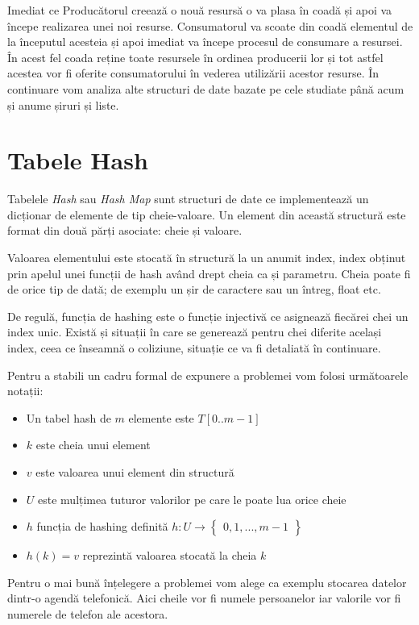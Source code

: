 Imediat ce Producătorul creează o nouă resursă o va plasa în coadă și apoi va începe realizarea unei noi resurse. Consumatorul va scoate din coadă elementul de la începutul acesteia și apoi imediat va începe procesul de consumare a resursei. În acest fel coada reține toate resursele în ordinea producerii lor și tot astfel acestea vor fi oferite consumatorului în vederea utilizării acestor resurse.
În continuare vom analiza alte structuri de date bazate pe cele studiate până acum și anume șiruri și liste. 

\section{Tabele Hash}

Tabelele \textit{Hash} sau \textit{Hash Map} sunt structuri de date ce implementează un dicționar de elemente de tip cheie-valoare. Un element din această structură este format din două părți asociate: cheie și valoare.

Valoarea elementului este stocată în structură la un anumit index, index obținut prin apelul unei funcții de hash având drept cheia ca și parametru. Cheia poate fi de orice tip de dată; de exemplu un șir de caractere sau un întreg, float etc.

De regulă, funcția de hashing este o funcție injectivă ce asignează fiecărei chei un index unic. Există și situații în care se generează pentru chei diferite același index, ceea ce înseamnă o coliziune, situație ce va fi detaliată în continuare.

Pentru a stabili un cadru formal de expunere a problemei vom folosi următoarele notații:

\begin{itemize}
\item{Un tabel hash de $m$ elemente este $T[0..m-1]$}
\item{$k$ este cheia unui element}
\item{$v$ este valoarea unui element din structură}
\item{$U$ este mulțimea tuturor valorilor pe care le poate lua orice cheie}
\item{$h$ funcția de hashing definită $h:U \rightarrow   \begin{Bmatrix} 0,1,...,m-1 \end{Bmatrix}$ }
\item{$h(k)=v$ reprezintă valoarea stocată la cheia $k$}
\end{itemize}

Pentru o mai bună înțelegere a problemei vom alege ca exemplu stocarea datelor dintr-o agendă telefonică. Aici cheile vor fi numele persoanelor iar valorile vor fi numerele de telefon ale acestora.

